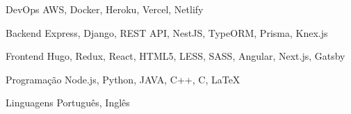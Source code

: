 

\begin{cvskills}

  \cvskill
    {DevOps} %
    {AWS, Docker, Heroku, Vercel, Netlify} %

  \cvskill
    {Backend} %
    {Express, Django, REST API, NestJS, TypeORM, Prisma, Knex.js} %

  \cvskill
    {Frontend} %
    {Hugo, Redux, React, HTML5, LESS, SASS, Angular, Next.js, Gatsby} %

  \cvskill
    {Programação} %
    {Node.js, Python, JAVA, C++, C, LaTeX} %

  \cvskill
    {Linguagens} %
    {Português, Inglês} %

\end{cvskills}
